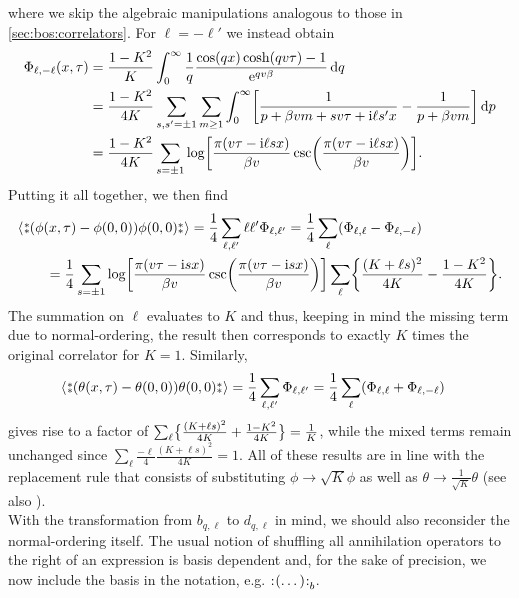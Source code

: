where we skip the algebraic manipulations analogous to those in \autoref{sec:bos:correlators}.
For $\ell=-\ell'$ we instead obtain
\begin{align*}
\Phi_{\ell,-\ell}(x,\tau) &= \frac{1-K^2}{K} \intx{0}{\infty}{\frac{1}{q} \frac{\cos(qx) \cosh(qv\tau) - 1}{\powe{qv\beta}}}{q}\\
&= \frac{1-K^2}{4K} \sum_{s,s'=\pm 1} \sum_{m\ge 1} \intx{0}{\infty}{\klb*{\frac{1}{p + \beta vm + sv\tau + \i\ell s'x} - \frac{1}{p + \beta vm}}}{p}\\
&= \frac{1-K^2}{4K} \sum_{s=\pm 1} \log\klb*{\frac{\pi (v\tau - \i\ell sx)}{\beta v} \csc\kla*{\frac{\pi (v\tau - \i\ell sx)}{\beta v}}}.
\end{align*}
Putting it all together, we then find
\begin{align*}
&\bra*{\varnormord{\kla*{\phi(x,\tau) - \phi(0,0)} \phi(0,0)}} = \frac{1}{4} \sum_{\ell,\ell'} \ell\ell'\Phi_{\ell,\ell'} = \frac{1}{4} \sum_{\ell} \kla*{\Phi_{\ell,\ell} - \Phi_{\ell,-\ell}}\\
&\qquad= \frac{1}{4} \sum_{s=\pm 1} \log\klb*{\frac{\pi (v\tau - \i sx)}{\beta v} \csc\kla*{\frac{\pi (v\tau - \i sx)}{\beta v}}} \sum_\ell \klc*{\frac{(K+\ell s)^2}{4K} - \frac{1-K^2}{4K}}.
\end{align*}
The summation on $\ell$ evaluates to $K$ and thus, keeping in mind the missing term due to normal-ordering, the result then corresponds to exactly $K$ times the original correlator for $K=1$.
Similarly,
\begin{align*}
&\bra*{\varnormord{\kla*{\theta(x,\tau) - \theta(0,0)} \theta(0,0)}} = \frac{1}{4} \sum_{\ell,\ell'} \Phi_{\ell,\ell'} = \frac{1}{4} \sum_{\ell} \kla*{\Phi_{\ell,\ell} + \Phi_{\ell,-\ell}}
\end{align*}
gives rise to a factor of $\sum_\ell \klc[\big]{\frac{(K+\ell s)^2}{4K} + \frac{1-K^2}{4K}} = \frac{1}{K}$, while the mixed terms remain unchanged since $\sum_\ell \frac{-\ell}{4} \frac{(K+\ell s)^2}{4K} = 1$.
All of these results are in line with the replacement rule that consists of substituting $\phi\rightarrow \sqrt{K} \phi$ as well as $\theta\rightarrow \frac{1}{\sqrt{K}}\theta$ (see also \cite[]{Giamarchi_2004}).\\
With the transformation from $b_{q,\ell}$ to $d_{q,\ell}$ in mind, we should also reconsider the normal-ordering itself.
The usual notion of shuffling all annihilation operators to the right of an expression is basis dependent and, for the sake of precision, we now include the basis in the notation, e.g. $\normord{(\dots)}_b$.
